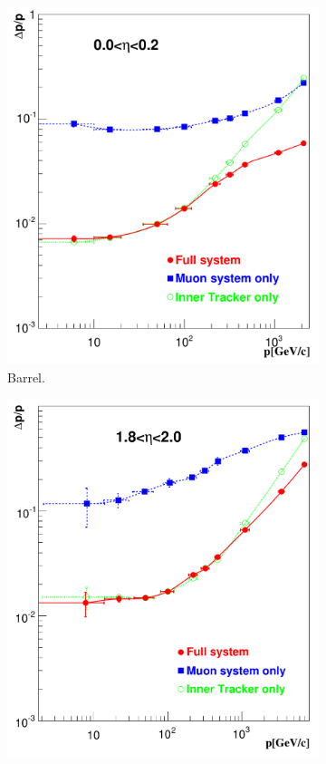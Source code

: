 \begin{figure}[htbp]
  \centering
  \begin{subfigure}{0.48\textwidth}
    \centering
    \includegraphics[width=\textwidth]{muon_barrel}
    \caption{Barrel.}
    \label{fig:muon_barrel}
  \end{subfigure}
  \begin{subfigure}{0.48\textwidth}
    \centering
    \includegraphics[width=\textwidth]{muon_endcap}

\end{subfigure}
\end{figure}
